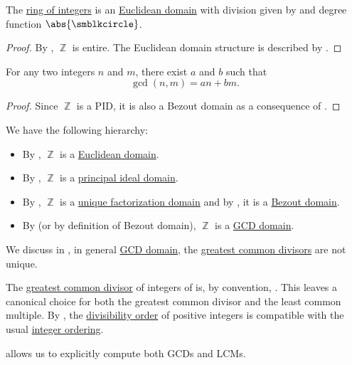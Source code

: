 \begin{proposition}\label{thm:integers_are_euclidean_domain}
  The \hyperref[def:integers]{ring of integers} is an \hyperref[def:euclidean_domain]{Euclidean domain} with division given by  and degree function \( \abs{\anon} \).
\end{proposition}
\begin{proof}
  By , \( \BbbZ \) is entire. The Euclidean domain structure is described by .
\end{proof}

\begin{lemma}\label{thm:bezout_lemma}
  For any two integers \( n \) and \( m \), there exist \( a \) and \( b \) such that
  \begin{equation*}
    \gcd(n, m) = an + bm.
  \end{equation*}
\end{lemma}
\begin{proof}
  Since \( \BbbZ \) is a PID, it is also a Bezout domain as a consequence of .
\end{proof}

\begin{remark}\label{rem:integer_domain_chain}\hfill
  We have the following hierarchy:
  \begin{itemize}
    \item By , \( \BbbZ \) is a \hyperref[def:euclidean_domain]{Euclidean domain}.
    \item By , \( \BbbZ \) is a \hyperref[def:principal_ideal_domain]{principal ideal domain}.
    \item By , \( \BbbZ \) is a \hyperref[def:unique_factorization_domain]{unique factorization domain} and by , it is a \hyperref[def:bezout_domain]{Bezout domain}.
    \item By  (or by definition of Bezout domain), \( \BbbZ \) is a \hyperref[def:gcd_domain]{GCD domain}.
  \end{itemize}
\end{remark}

\begin{remark}\label{rem:integer_gcd}
  We discuss in , in general \hyperref[def:gcd_domain]{GCD domain}, the \hyperref[def:gcd]{greatest common divisors} are not unique.

  The \hyperref[def:gcd]{greatest common divisor} of integers of is, by convention, . This leaves a canonical choice for both the greatest common divisor and the least common multiple. By , the \hyperref[thm:semiring_divisibility_order]{divisibility order} of positive integers is compatible with the usual \hyperref[def:integer_ordering]{integer ordering}.

   allows us to explicitly compute both GCDs and LCMs.
\end{remark}

